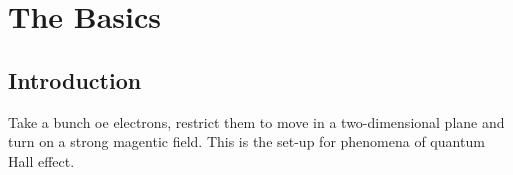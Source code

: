 \section{The Basics}
\subsection{Introduction}\label{sec:1.1}
Take a bunch oe electrons, restrict them to move in a two-dimensional plane and turn on a strong magentic field.
This is the set-up for phenomena of quantum Hall effect.
